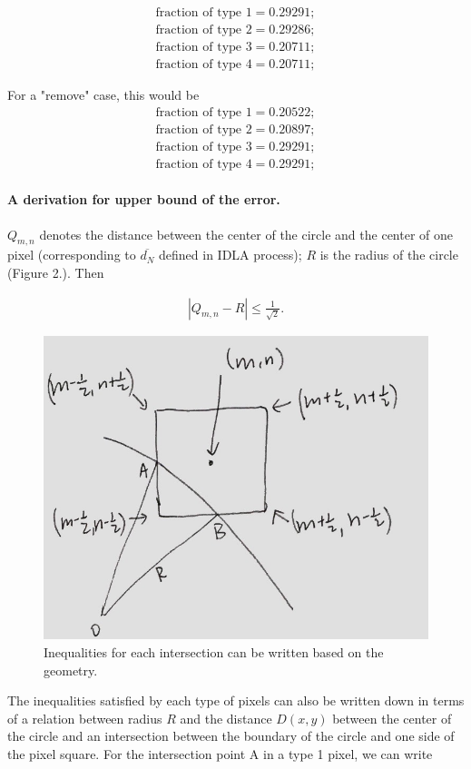 \documentclass[letterpaper]{article}
\numberwithin{equation}{section} %
\numberwithin{figure}{section} %
\numberwithin{table}{section} %
\begin{document}
\begin{align} 
\text{fraction of type 1}=0.29291; \\
\text{fraction of type 2}=0.29286; \\
\text{fraction of type 3}=0.20711; \\
\text{fraction of type 4}=0.20711; 
\end{align}

\noindent
For a "remove" case, this would be
\begin{align} 
\text{fraction of type 1}=0.20522; \\
\text{fraction of type 2}=0.20897; \\
\text{fraction of type 3}=0.29291; \\
\text{fraction of type 4}=0.29291; 
\end{align}

\paragraph{A derivation for upper bound of the error.}
$Q_{m,n}$ denotes the distance between the center of the circle and the center of one pixel (corresponding to $\overline{d_N}$ defined in IDLA process); $R$ is the radius of the circle (Figure 2.). Then 

\begin{align} 
|Q_{m,n}-R| \leq \frac{1}{\sqrt{2}}.
\end{align}

\begin{figure}[h]
	\centering
	\includegraphics[width=0.5\linewidth]{4tyDeri}
	\caption{Inequalities for each intersection can be written based on the geometry.}
	\label{fig:4tyDeri}
\end{figure}


\noindent
The inequalities satisfied by each type of pixels can also be written down in terms of a relation between radius $R$ and the distance $D(x,y)$ between the center of the circle and an intersection between the boundary of the circle and one side of the pixel square. For the intersection point A in a type 1 pixel, we can write 
\end{document}
